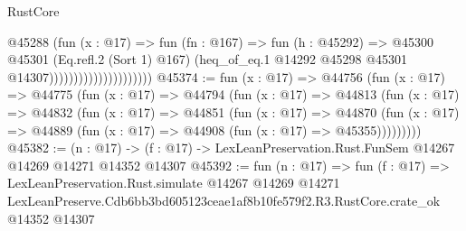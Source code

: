 \begin{lexlean}{RustCore}
\begin{coremodule}
                                        @45288
                                          (fun (x : @17) =>
                                          fun (fn : @167) =>
                                          fun (h : @45292) =>
                                          @45300
                                            @45301
                                            (Eq.refl.{2} (Sort 1) @167)
                                            (heq_of_eq.{1}
                                              @14292
                                              @45298
                                              @45301
                                              @14307)))))))))))))))))))))
@45374 := fun (x : @17) =>
  @44756
    (fun (x : @17) =>
    @44775
      (fun (x : @17) =>
      @44794
        (fun (x : @17) =>
        @44813
          (fun (x : @17) =>
          @44832
            (fun (x : @17) =>
            @44851
              (fun (x : @17) =>
              @44870
                (fun (x : @17) => @44889 (fun (x : @17) => @44908 (fun (x : @17) => @45355)))))))))
@45382 := (n : @17) ->
  (f : @17) -> LexLeanPreservation.Rust.FunSem @14267 @14269 @14271 @14352 @14307
@45392 := fun (n : @17) =>
  fun (f : @17) =>
  LexLeanPreservation.Rust.simulate
    @14267
    @14269
    @14271
    LexLeanPreserve.Cdb6bb3bd605123ceae1af8b10fe579f2.R3.RustCore.crate_ok
    @14352
    @14307
\end{coremodule}
\end{lexlean}
